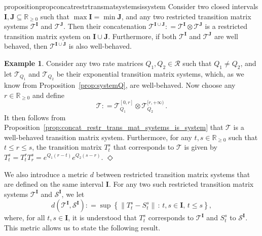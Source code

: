 \documentclass[10pt,a4paper]{paper}
\theoremstyle{definition}
\newtheorem{exmp}{Example}
\newcommand{\reals}{\mathbb{R}}
\newcommand{\realsnonneg}{\reals_{\geq 0}}
\newcommand{\norm}[1]{\left\lVert #1 \right\rVert}
\newcommand{\coloneqq}{:\!=}
\newcommand{\exampleend}{\hfill$\Diamond$}
\begin{document}
\begin{restatable}{proposition}{propconcatrestrtransmatsystemsissystem}
\label{prop:concat_restr_trans_mat_systems_is_system}
Consider two closed intervals $\mathbf{I},\mathbf{J}\subseteq\realsnonneg$ such that $\max\mathbf{I}=\min\mathbf{J}$, and any two restricted transition matrix systems $\mathcal{T}^{\mathbf{I}}$ and $\mathcal{T}^{\mathbf{J}}$. Then their concatenation $\mathcal{T}^{\mathbf{I}\cup \mathbf{J}} \coloneqq \mathcal{T}^{\mathbf{I}}\otimes \mathcal{T}^{\mathbf{J}}$ is a restricted transition matrix system on $\mathbf{I}\cup\mathbf{J}$. Furthermore, if both $\mathcal{T}^{\mathbf{I}}$ and $\mathcal{T}^{\mathbf{J}}$ are well behaved, then $\mathcal{T}^{\mathbf{I}\cup\mathbf{J}}$ is also well-behaved.
\end{restatable}

\begin{exmp}\label{exmp:combinetwoexponentials}
Consider any two rate matrices $Q_1,Q_2\in\mathcal{R}$ such that $Q_1\neq Q_2$, and let $\mathcal{T}_{Q_1}$ and $\mathcal{T}_{Q_2}$ be their exponential transition matrix systems, which, as we know from Proposition~\ref{prop:systemQ}, are well-behaved. Now choose any $r\in\realsnonneg$ and define
\begin{equation*}
\mathcal{T} \coloneqq \mathcal{T}_{Q_1}^{[0,r]} \otimes \mathcal{T}_{Q_2}^{[r,+\infty)}\,.
\end{equation*}
It then follows from Proposition~\ref{prop:concat_restr_trans_mat_systems_is_system} that $\mathcal{T}$ is a well-behaved transition matrix system. Furthermore, for any $t,s\in\realsnonneg$ such that $t\leq r\leq s$, the transition matrix $T_t^s$ that corresponds to $\mathcal{T}$ is given by $T_t^s = T_t^rT_r^s = e^{Q_1(r-t)}e^{Q_2(s-r)}$.
\exampleend
\end{exmp}

We also introduce a metric $d$ between restricted transition matrix systems that are defined on the same interval $\mathbf{I}$. For any two such restricted transition matrix systems $\mathcal{T}^\mathbf{I}$ and $\mathcal{S}^\mathbf{I}$, we let
\begin{equation}\label{eq:trans_mat_system_metric}
d(\mathcal{T}^{\mathbf{I}},\mathcal{S}^{\mathbf{I}}) \coloneqq \sup\left\{\norm{T_t^s - S_t^s}\,:\,t,s\in\mathbf{I},\,t\leq s\right\},
\end{equation}
where, for all $t,s\in\mathbf{I}$, it is understood that $T_t^s$ corresponds to $\mathcal{T}^{\mathbf{I}}$ and $S_t^s$ to $\mathcal{S}^{\mathbf{I}}$. This metric allows us to state the following result.
\end{document}
